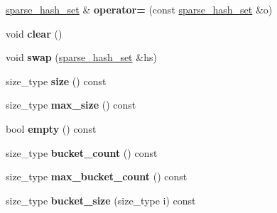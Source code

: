 \begin{DoxyCompactItemize}
\item 
\hyperlink{classspp___1_1sparse__hash__set}{sparse\+\_\+hash\+\_\+set} \& {\bfseries operator=} (const \hyperlink{classspp___1_1sparse__hash__set}{sparse\+\_\+hash\+\_\+set} \&o)\hypertarget{classspp___1_1sparse__hash__set_adbcbef30495b0bb89bb9ef17b5cd0307}{}\label{classspp___1_1sparse__hash__set_adbcbef30495b0bb89bb9ef17b5cd0307}

\item 
void {\bfseries clear} ()\hypertarget{classspp___1_1sparse__hash__set_abfc380f56a4e416fd30ecf91b846396d}{}\label{classspp___1_1sparse__hash__set_abfc380f56a4e416fd30ecf91b846396d}

\item 
void {\bfseries swap} (\hyperlink{classspp___1_1sparse__hash__set}{sparse\+\_\+hash\+\_\+set} \&hs)\hypertarget{classspp___1_1sparse__hash__set_a779a6289ce9435402a092f5232a4c8dc}{}\label{classspp___1_1sparse__hash__set_a779a6289ce9435402a092f5232a4c8dc}

\item 
size\+\_\+type {\bfseries size} () const \hypertarget{classspp___1_1sparse__hash__set_acb0fc0c585b607a02bd1f0b021a557ba}{}\label{classspp___1_1sparse__hash__set_acb0fc0c585b607a02bd1f0b021a557ba}

\item 
size\+\_\+type {\bfseries max\+\_\+size} () const \hypertarget{classspp___1_1sparse__hash__set_af773d822f00cb9e7fdcdf7fb85462319}{}\label{classspp___1_1sparse__hash__set_af773d822f00cb9e7fdcdf7fb85462319}

\item 
bool {\bfseries empty} () const \hypertarget{classspp___1_1sparse__hash__set_aea3b8ddf7b1793f655fee07188b7f7f7}{}\label{classspp___1_1sparse__hash__set_aea3b8ddf7b1793f655fee07188b7f7f7}

\item 
size\+\_\+type {\bfseries bucket\+\_\+count} () const \hypertarget{classspp___1_1sparse__hash__set_aca61a6e7b6bdf2e83d9784cf2446eded}{}\label{classspp___1_1sparse__hash__set_aca61a6e7b6bdf2e83d9784cf2446eded}

\item 
size\+\_\+type {\bfseries max\+\_\+bucket\+\_\+count} () const \hypertarget{classspp___1_1sparse__hash__set_a1299222e8059a22d42550ad4fc169106}{}\label{classspp___1_1sparse__hash__set_a1299222e8059a22d42550ad4fc169106}

\item 
size\+\_\+type {\bfseries bucket\+\_\+size} (size\+\_\+type i) const \hypertarget{classspp___1_1sparse__hash__set_a28b530b32d279150e605b536c6114122}{}\label{classspp___1_1sparse__hash__set_a28b530b32d279150e605b536c6114122}


\end{DoxyCompactItemize}
